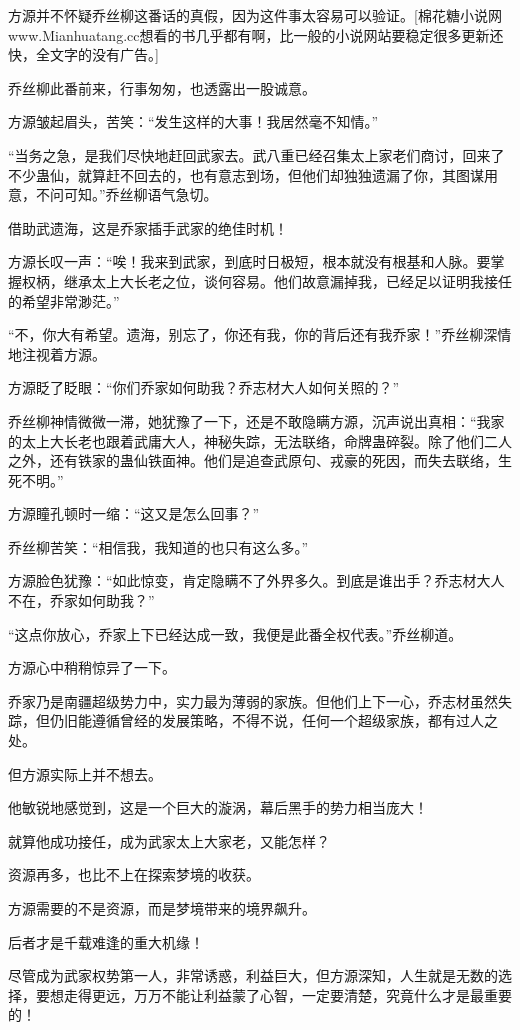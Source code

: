 \begin{this_body}
方源并不怀疑乔丝柳这番话的真假，因为这件事太容易可以验证。[棉花糖小说网www.Mianhuatang.cc想看的书几乎都有啊，比一般的小说网站要稳定很多更新还快，全文字的没有广告。]

乔丝柳此番前来，行事匆匆，也透露出一股诚意。

方源皱起眉头，苦笑：“发生这样的大事！我居然毫不知情。”

“当务之急，是我们尽快地赶回武家去。武八重已经召集太上家老们商讨，回来了不少蛊仙，就算赶不回去的，也有意志到场，但他们却独独遗漏了你，其图谋用意，不问可知。”乔丝柳语气急切。

借助武遗海，这是乔家插手武家的绝佳时机！

方源长叹一声：“唉！我来到武家，到底时日极短，根本就没有根基和人脉。要掌握权柄，继承太上大长老之位，谈何容易。他们故意漏掉我，已经足以证明我接任的希望非常渺茫。”

“不，你大有希望。遗海，别忘了，你还有我，你的背后还有我乔家！”乔丝柳深情地注视着方源。

方源眨了眨眼：“你们乔家如何助我？乔志材大人如何关照的？”

乔丝柳神情微微一滞，她犹豫了一下，还是不敢隐瞒方源，沉声说出真相：“我家的太上大长老也跟着武庸大人，神秘失踪，无法联络，命牌蛊碎裂。除了他们二人之外，还有铁家的蛊仙铁面神。他们是追查武原句、戎豪的死因，而失去联络，生死不明。”

方源瞳孔顿时一缩：“这又是怎么回事？”

乔丝柳苦笑：“相信我，我知道的也只有这么多。”

方源脸色犹豫：“如此惊变，肯定隐瞒不了外界多久。到底是谁出手？乔志材大人不在，乔家如何助我？”

“这点你放心，乔家上下已经达成一致，我便是此番全权代表。”乔丝柳道。

方源心中稍稍惊异了一下。

乔家乃是南疆超级势力中，实力最为薄弱的家族。但他们上下一心，乔志材虽然失踪，但仍旧能遵循曾经的发展策略，不得不说，任何一个超级家族，都有过人之处。

但方源实际上并不想去。

他敏锐地感觉到，这是一个巨大的漩涡，幕后黑手的势力相当庞大！

就算他成功接任，成为武家太上大家老，又能怎样？

资源再多，也比不上在探索梦境的收获。

方源需要的不是资源，而是梦境带来的境界飙升。

后者才是千载难逢的重大机缘！

尽管成为武家权势第一人，非常诱惑，利益巨大，但方源深知，人生就是无数的选择，要想走得更远，万万不能让利益蒙了心智，一定要清楚，究竟什么才是最重要的！


\end{this_body}
